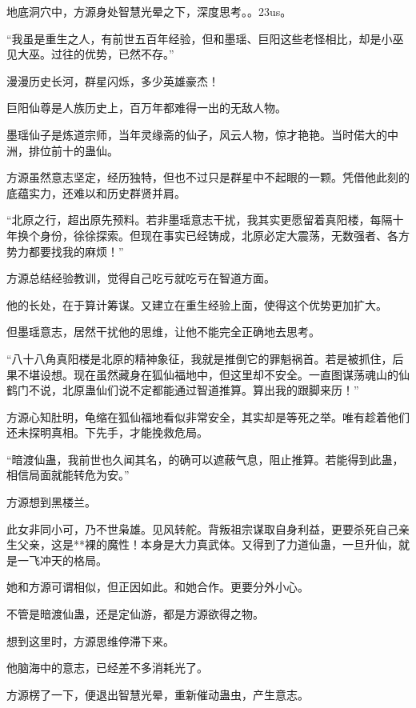 
\begin{this_body}

地底洞穴中，方源身处智慧光晕之下，深度思考。。23us。

“我虽是重生之人，有前世五百年经验，但和墨瑶、巨阳这些老怪相比，却是小巫见大巫。过往的优势，已然不存。”

漫漫历史长河，群星闪烁，多少英雄豪杰！

巨阳仙尊是人族历史上，百万年都难得一出的无敌人物。

墨瑶仙子是炼道宗师，当年灵缘斋的仙子，风云人物，惊才艳艳。当时偌大的中洲，排位前十的蛊仙。

方源虽然意志坚定，经历独特，但也不过只是群星中不起眼的一颗。凭借他此刻的底蕴实力，还难以和历史群贤并肩。

“北原之行，超出原先预料。若非墨瑶意志干扰，我其实更愿留着真阳楼，每隔十年换个身份，徐徐探索。但现在事实已经铸成，北原必定大震荡，无数强者、各方势力都要找我的麻烦！”

方源总结经验教训，觉得自己吃亏就吃亏在智道方面。

他的长处，在于算计筹谋。又建立在重生经验上面，使得这个优势更加扩大。

但墨瑶意志，居然干扰他的思维，让他不能完全正确地去思考。

“八十八角真阳楼是北原的精神象征，我就是推倒它的罪魁祸首。若是被抓住，后果不堪设想。现在虽然藏身在狐仙福地中，但这里却不安全。一直图谋荡魂山的仙鹤门不说，北原蛊仙们说不定都能通过智道推算。算出我的跟脚来历！”

方源心知肚明，龟缩在狐仙福地看似非常安全，其实却是等死之举。唯有趁着他们还未探明真相。下先手，才能挽救危局。

“暗渡仙蛊，我前世也久闻其名，的确可以遮蔽气息，阻止推算。若能得到此蛊，相信局面就能转危为安。”

方源想到黑楼兰。

此女非同小可，乃不世枭雄。见风转舵。背叛祖宗谋取自身利益，更要杀死自己亲生父亲，这是**裸的魔性！本身是大力真武体。又得到了力道仙蛊，一旦升仙，就是一飞冲天的格局。

她和方源可谓相似，但正因如此。和她合作。更要分外小心。

不管是暗渡仙蛊，还是定仙游，都是方源欲得之物。

想到这里时，方源思维停滞下来。

他脑海中的意志，已经差不多消耗光了。

方源楞了一下，便退出智慧光晕，重新催动蛊虫，产生意志。


\end{this_body}
